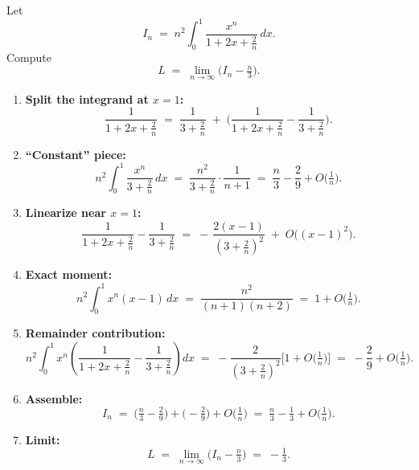 \documentclass[12pt]{article}
\begin{document}
Let
\[
I_n \;=\; n^2 \int_{0}^{1}\frac{x^{n}}{1+2x+\frac{2}{n}}\,dx.
\]
Compute
\[
L \;=\; \lim_{n\to\infty}\Big( I_n - \tfrac{n}{3}\Big).
\]

\begin{enumerate}
    \item \textbf{Split the integrand at $x=1$:}
    \[
    \frac{1}{1+2x+\tfrac{2}{n}}
    \;=\; \frac{1}{3+\tfrac{2}{n}}
    \;+\;\bigg(\frac{1}{1+2x+\tfrac{2}{n}}-\frac{1}{3+\tfrac{2}{n}}\bigg).
    \]

    \item \textbf{“Constant” piece:}
    \[
    n^2\!\int_0^1 \frac{x^n}{3+\tfrac{2}{n}}\,dx
    \;=\; \frac{n^2}{3+\tfrac{2}{n}}\cdot\frac{1}{n+1}
    \;=\; \frac{n}{3}-\frac{2}{9}+O\!\Big(\tfrac{1}{n}\Big).
    \]

    \item \textbf{Linearize near $x=1$:}
    \[
    \frac{1}{1+2x+\tfrac{2}{n}}-\frac{1}{3+\tfrac{2}{n}}
    \;=\; -\,\frac{2(x-1)}{(3+\tfrac{2}{n})^2} \;+\; O\big((x-1)^2\big).
    \]

    \item \textbf{Exact moment:}
    \[
    n^2\!\int_0^1 x^n(x-1)\,dx
    \;=\; \frac{n^2}{(n+1)(n+2)} \;=\; 1+O\!\Big(\tfrac{1}{n}\Big).
    \]

    \item \textbf{Remainder contribution:}
    \[
    n^2\!\int_0^1 x^n\!\left(\frac{1}{1+2x+\tfrac{2}{n}}-\frac{1}{3+\tfrac{2}{n}}\right)\!dx
    \;=\; -\frac{2}{(3+\tfrac{2}{n})^2}\Big[1+O\!\Big(\tfrac{1}{n}\Big)\Big]
    \;=\; -\frac{2}{9}+O\!\Big(\tfrac{1}{n}\Big).
    \]

    \item \textbf{Assemble:}
    \[
    I_n \;=\; \Big(\tfrac{n}{3}-\tfrac{2}{9}\Big) + \Big(-\tfrac{2}{9}\Big) + O\!\Big(\tfrac{1}{n}\Big)
    \;=\; \tfrac{n}{3}-\tfrac{1}{3}+O\!\Big(\tfrac{1}{n}\Big).
    \]

    \item \textbf{Limit:}
    \[
    L \;=\; \lim_{n\to\infty}\Big(I_n-\tfrac{n}{3}\Big) \;=\; -\tfrac{1}{3}.
    \]
\end{enumerate}
\end{document}

